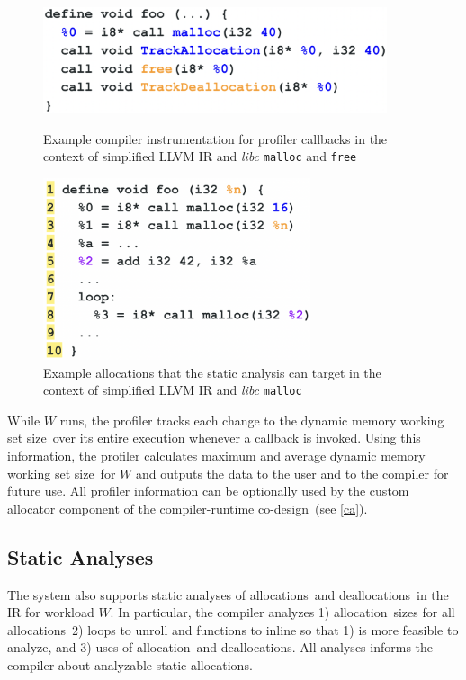\documentclass{article}
\def\crcd{compiler-runtime co-design}
\def\ALL{allocation}
\def\ALLS{allocations}
\def\DALLS{deallocations}
\def\DWS{dynamic memory working set size}
\begin{document}
\begin{figure}
    \centering
    \begin{minipage}{0.45\textwidth}
        \centering
        \includegraphics[width=0.9\textwidth]{figs/pins.png} 
        \caption{Example compiler instrumentation for profiler callbacks in the 
        context of simplified LLVM IR and \textit{libc} \texttt{malloc}
        and \texttt{free}}  
	    \label{fig:pins}
    \end{minipage}\hfill
    \begin{minipage}{0.45\textwidth}
        \centering
        \includegraphics[width=0.70\textwidth]{figs/sizes.png} 
        \caption{Example allocations that the static analysis can target in the 
        context of simplified LLVM IR and \textit{libc} \texttt{malloc}}  
	    \label{fig:sizes}
    \end{minipage}\hfill
\end{figure}

While $W$ runs, the profiler tracks each change to the \DWS\ over its entire execution 
whenever a callback is invoked. Using this information, the profiler calculates maximum 
and average \DWS\ for $W$ and outputs the data to the user and to the compiler for future 
use. All profiler information can be optionally used by the custom allocator component of
the \crcd\ (see \ref{ca}).

\subsection{Static Analyses} \label{sa}
The system also supports static analyses of \ALLS\ and \DALLS\ in the IR for workload $W$. 
In particular, the compiler analyzes 1) \ALL\ sizes for all \ALLS\, 2) loops to unroll 
and functions to inline so that 1) is more feasible to analyze, and 3) uses of \ALL\ and 
\DALLS . All analyses informs the compiler about analyzable static allocations. 
\end{document}
